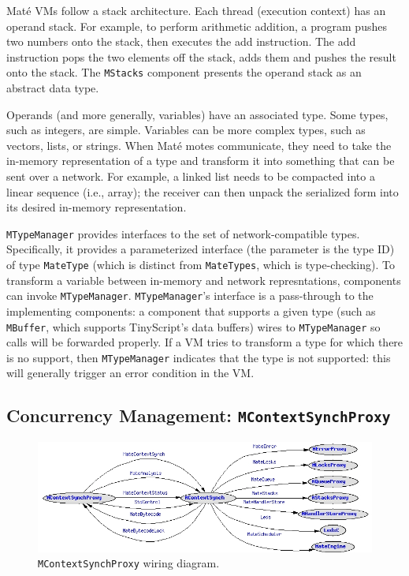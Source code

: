 \documentclass[12pt]{article}
\newcommand{\mate}{Mat\'{e}\xspace}
\begin{document}
\mate VMs follow a stack architecture. Each thread (execution context)
has an operand stack.  For example, to perform arithmetic addition, a
program pushes two numbers onto the stack, then executes the add
instruction. The add instruction pops the two elements off the stack,
adds them and pushes the result onto the stack. The {\tt MStacks}
component presents the operand stack as an abstract data type.

Operands (and more generally, variables) have an associated type. Some
types, such as integers, are simple. Variables can be more complex
types, such as vectors, lists, or strings. When \mate motes
communicate, they need to take the in-memory representation of a type
and transform it into something that can be sent over a network. For
example, a linked list needs to be compacted into a linear sequence
(i.e., array); the receiver can then unpack the serialized form into
its desired in-memory representation.

{\tt MTypeManager} provides interfaces to the set of
network-compatible types. Specifically, it provides a parameterized
interface (the parameter is the type ID) of type {\tt MateType} (which
is distinct from {\tt MateTypes}, which is type-checking). To
transform a variable between in-memory and network represntations,
components can invoke {\tt MTypeManager}. {\tt MTypeManager}'s
interface is a pass-through to the implementing components: a
component that supports a given type (such as {\tt MBuffer}, which
supports TinyScript's data buffers) wires to {\tt MTypeManager} so
calls will be forwarded properly. If a VM tries to transform a type
for which there is no support, then {\tt MTypeManager} indicates that
the type is not supported: this will generally trigger an error
condition in the VM.

\subsection{Concurrency Management: {\tt MContextSynchProxy}}


\begin{figure}
\centering
\includegraphics[width=6in]{fig/MContextSynchProxy.jpg}
\caption{{\tt MContextSynchProxy} wiring diagram.}
\label{fig:mcontext-synch-proxy}
\end{figure}
\end{document}
